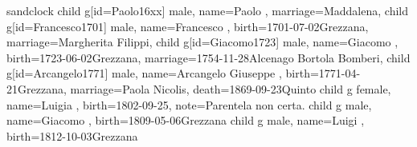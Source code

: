 \documentclass{article}
\begin{document}
\begin{midpage}
\begin{center}

\begin{genealogypicture}[
    processing=database,
    database format=full,
    node size=3.5cm,
    level size=2.8cm,
    level distance=6mm,
    list separators hang=3mm,
    name font=\bfseries,
    surn code={\textcolor{black!50!black}{#1}},
    place text={\newline}{},
    date format=d month yyyy,
    tcbset={male/.style={colframe=blue,colback=blue!5},
    female/.style={colframe=red,colback=red!5}},
    box={fit basedim=7pt,boxsep=2pt,segmentation style=solid,
        halign=left,before upper=\parskip1pt,
        \gtrDBsex,
    },
]
sandclock
{
    child{
        g[id=Paolo16xx]{
            male,
            name={Paolo },
            marriage={Maddalena}{},
        }
        child{
            g[id=Francesco1701]{
                male,
                name={Francesco },
                birth={1701-07-02}{Grezzana},
                marriage={Margherita Filippi}{},
            }
            child{
                g[id=Giacomo1723]{
                    male,
                    name={Giacomo },
                    birth={1723-06-02}{Grezzana},
                    marriage={1754-11-28}{Alcenago \newline Bortola Bomberi},
                }
                child{
                    g[id=Arcangelo1771]{
                        male,
                        name={Arcangelo Giuseppe },
                        birth={1771-04-21}{Grezzana},
                        marriage={Paola Nicolis}{},
                        death={1869-09-23}{Quinto}
                    }
                    child{
                        g{
                            female,
                            name={Luigia },
                            birth={1802-09-25}{},
                            note={Parentela non certa.}
                        }
                    }
                    child{
                        g{
                            male,
                            name={Giacomo },
                            birth={1809-05-06}{Grezzana}
                        }
                    }
                    child{
                        g{
                            male,
                            name={Luigi },
                            birth={1812-10-03}{Grezzana}
                        }
}}}}}}
\end{genealogypicture}
\end{center}
\end{midpage}
\end{document}
